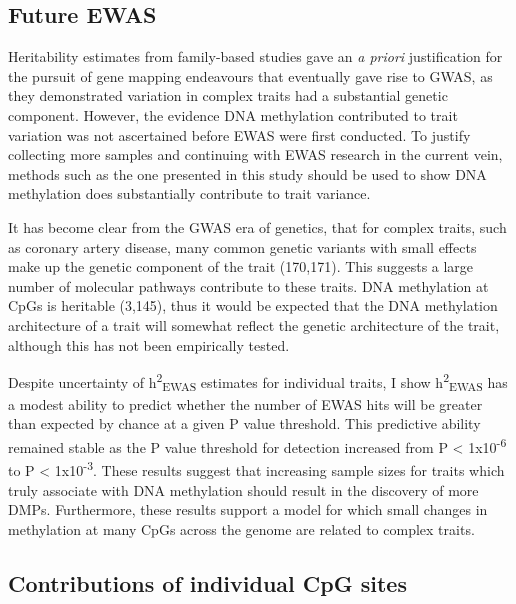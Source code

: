 \documentclass[11pt,oneside]{bristolthesis}
\begin{document}
\hypertarget{future-ewas-05}{%
\subsection{Future EWAS}\label{future-ewas-05}}

Heritability estimates from family-based studies gave an \emph{a priori} justification for the pursuit of gene mapping endeavours that eventually gave rise to GWAS, as they demonstrated variation in complex traits had a substantial genetic component. However, the evidence DNA methylation contributed to trait variation was not ascertained before EWAS were first conducted. To justify collecting more samples and continuing with EWAS research in the current vein, methods such as the one presented in this study should be used to show DNA methylation does substantially contribute to trait variance.

It has become clear from the GWAS era of genetics, that for complex traits, such as coronary artery disease, many common genetic variants with small effects make up the genetic component of the trait (170,171). This suggests a large number of molecular pathways contribute to these traits. DNA methylation at CpGs is heritable (3,145), thus it would be expected that the DNA methylation architecture of a trait will somewhat reflect the genetic architecture of the trait, although this has not been empirically tested.

Despite uncertainty of h\textsuperscript{2}\textsubscript{EWAS} estimates for individual traits, I show h\textsuperscript{2}\textsubscript{EWAS} has a modest ability to predict whether the number of EWAS hits will be greater than expected by chance at a given P value threshold. This predictive ability remained stable as the P value threshold for detection increased from P \textless{} 1x10\textsuperscript{-6} to P \textless{} 1x10\textsuperscript{-3}. These results suggest that increasing sample sizes for traits which truly associate with DNA methylation should result in the discovery of more DMPs. Furthermore, these results support a model for which small changes in methylation at many CpGs across the genome are related to complex traits.

\hypertarget{contribution-of-individual-cpg-sites}{%
\subsection{Contributions of individual CpG sites}\label{contribution-of-individual-cpg-sites}}
\end{document}
